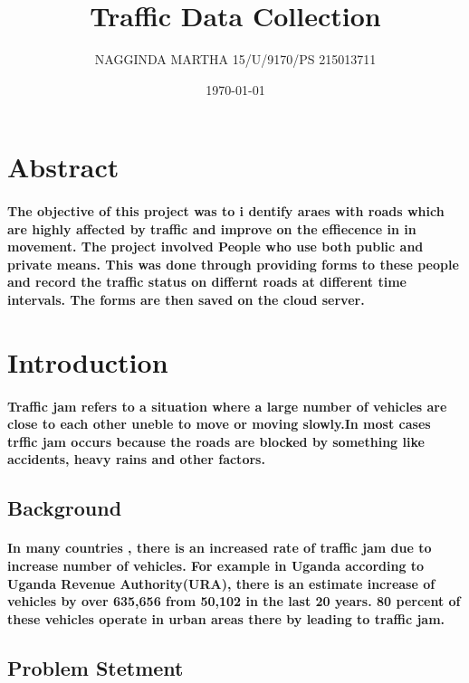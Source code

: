 \documentclass[a4paper,11pt]{article}
\begin{document}
\begin{titlepage}


\title{Traffic Data Collection }
\author{NAGGINDA MARTHA   15/U/9170/PS 215013711}
\date{\today}
\end{titlepage}
\cleardoublepage
\maketitle
\tableofcontents
\cleardoublepage
\section{Abstract}
\paragraph{
The objective of this project was to i dentify araes with roads which are highly affected by traffic and improve on the effiecence in in movement. The project involved People who use both public and private means. This was done through providing forms to these people and record the traffic status on differnt roads at different time intervals. The forms are then saved on the cloud server. 
}
\section{Introduction}
\paragraph{Traffic jam refers to a situation where a large number of vehicles are close to each other uneble to move or moving slowly.In most cases trffic jam occurs because the roads are blocked by something like accidents, heavy rains and other factors.}
\subsection{Background}
\paragraph{In many countries , there is an increased rate of traffic jam due to increase number of vehicles. For example in Uganda according to Uganda Revenue Authority(URA), there is an estimate increase of vehicles by over 635,656 from 50,102 in the last 20 years. 80 percent of these vehicles operate in urban areas there by leading to traffic jam. }
\subsection{Problem Stetment}
\end{document}
